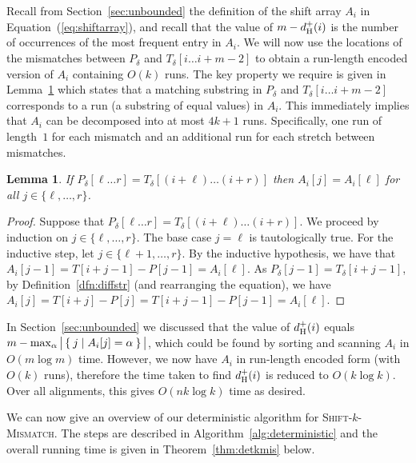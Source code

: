 \documentclass[11pt]{article}
\newcommand{\upto}{\ldots}
\newcommand{\DsHam}{\ensuremath{d_\textup{H}^+}}
\newcommand{\skMismatch}{\textsc{Shift-$k$-Mismatch}\xspace}
\newcommand{\dHam}{\DsHam}
\theoremstyle{plain}
\newtheorem{lemma}[theorem]{Lemma}
\theoremstyle{definition}
\begin{document}
Recall from Section~\ref{sec:unbounded} the definition of the shift array $A_i$ in Equation~(\ref{eq:shiftarray}), and recall that the value of $m-\dHam(i)$ is the number of occurrences of the most frequent entry in $A_i$. We will now use the locations of the mismatches between $P_\delta$ and $T_{\delta}[i\upto i+m-2]$ to obtain a run-length encoded version of $A_i$ containing $O(k)$ runs. The key property we require is given in Lemma~\ref{lem:run} which states that a matching substring in $P_\delta$ and $T_{\delta}[i\upto i+m-2]$ corresponds to a run (a substring of equal values) in $A_i$. This immediately implies that $A_i$ can be decomposed into at most $4k+1$ runs. Specifically, one run of length~$1$ for each mismatch and an additional run for each stretch between mismatches.

\begin{lemma}
    \label{lem:run}
    If $P_\delta[\ell \upto r] = T_\delta[(i+\ell) \upto (i+r)]$ then $A_i[j]=A_i[\ell]$ for all $j \in\{\ell,\ldots,r\}$.
\end{lemma}
\begin{proof}
    Suppose that $P_\delta[\ell \upto r] = T_\delta[(i+\ell)\upto (i+r)]$. We proceed by induction on $j \in\{\ell,\ldots,r\}$. The base case $j=\ell$ is tautologically true. For the inductive step, let $j \in\{\ell+1,\ldots,r\}$. By the inductive hypothesis, we have that $A_i[j-1]=T[i+j-1]-P[j-1]=A_i[\ell]$. As $P_\delta[j-1]=T_\delta[i+j-1]$, by Definition~\ref{dfn:diffstr} (and rearranging the equation), we have $A_i[j] = T[i+j]-P[j]=T[i+j-1]-P[j-1]=A_i[\ell]$.
\end{proof}

In Section~\ref{sec:unbounded} we discussed that the value of $\dHam(i)$ equals $m-\max_\alpha \big|\Set{ j | A_i[j]=\alpha } \big|$, which could be found by sorting and scanning $A_i$ in $O(m \log m)$ time. However, we now have $A_i$ in run-length encoded form (with $O(k)$ runs), therefore the time taken to find $\dHam(i)$ is reduced to $O(k \log k)$. Over all alignments, this gives $O(nk \log k)$ time as desired.

We can now give an overview of our deterministic algorithm for \skMismatch. The steps are described in Algorithm~\ref{alg:deterministic} and the overall running time is given in Theorem~\ref{thm:detkmis} below.
\end{document}

